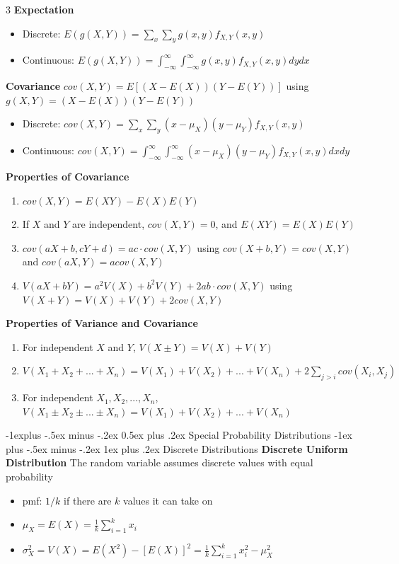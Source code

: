 \documentclass[10pt, landscape]{article}
\makeatletter
\renewcommand{\section}{\@startsection{section}{1}{0mm}%
                                {-1ex plus -.5ex minus -.2ex}%
                                {0.5ex plus .2ex}%
                                {\normalfont\large\bfseries}}
\renewcommand{\section}{\@startsection{section}{2}{0mm}%
                                {-1explus -.5ex minus -.2ex}%
                                {0.5ex plus .2ex}%
                                {\normalfont\normalsize\bfseries}}
\renewcommand{\subsection}{\@startsection{subsection}{3}{0mm}%
                                {-1ex plus -.5ex minus -.2ex}%
                                {1ex plus .2ex}%
                                {\normalfont\small\bfseries}}%
\makeatother
\begin{document}
\begin{multicols*}{3}
\textbf{Expectation}
\begin{itemize}
    \item Discrete: $E(g(X, Y))=\sum_x\sum_y g(x, y)f_{X, Y}(x, y)$
    \item Continuous: $E(g(X, Y))=\int_{-\infty}^\infty\int_{-\infty}^\infty g(x, y) f_{X, Y}(x, y)dydx$
\end{itemize}

\textbf{Covariance} $cov(X, Y)=E[(X-E(X))(Y-E(Y))]$ using $g(X, Y)=(X-E(X))(Y-E(Y))$
\begin{itemize}
    \item Discrete: $cov(X, Y)=\sum_x\sum_y(x-\mu_X)(y-\mu_Y)f_{X, Y}(x, y)$
    \item Continuous: $cov(X, Y)=\int_{-\infty}^\infty\int_{-\infty}^\infty(x-\mu_X)(y-\mu_Y)f_{X, Y}(x, y)dxdy$
\end{itemize}

\textbf{Properties of Covariance}
\begin{enumerate}
    \item $cov(X, Y)=E(XY)-E(X)E(Y)$
    \item If $X$ and $Y$ are independent, $cov(X, Y)=0$, and $E(XY)=E(X)E(Y)$
    \item $cov(aX+b, cY+d)=ac \cdot cov(X, Y)$ using $cov(X+b, Y)=cov(X, Y)$ and $cov(aX, Y)=acov(X, Y)$
    \item $V(aX+bY)=a^2V(X)+b^2V(Y)+2ab\cdot cov(X, Y)$ using $V(X+Y)=V(X)+V(Y)+2cov(X, Y)$
\end{enumerate}

\textbf{Properties of Variance and Covariance}
\begin{enumerate}
    \item For independent $X$ and $Y$, $V(X \pm Y)=V(X)+V(Y)$
    \item $V(X_1+X_2+...+X_n)=V(X_1)+V(X_2)+...+V(X_n)+2 \sum_{j > i}cov(X_i, X_j)$
    \item For independent $X_1, X_2, ... , X_n$, $V(X_1\pm X_2 \pm ... \pm X_n)=V(X_1)+V(X_2)+...+V(X_n)$
\end{enumerate}

\section{Special Probability Distributions}
\subsection{Discrete Distributions}
\textbf{Discrete Uniform Distribution} The random variable assumes discrete values with equal probability
\begin{itemize}
    \item pmf: $1/k$ if there are $k$ values it can take on
    \item $\mu_X=E(X)=\frac{1}{k}\sum_{i=1}^kx_i$
    \item $\sigma_X^2=V(X)=E(X^2)-[E(X)]^2=\frac{1}{k}\sum_{i=1}^k x_i^2-\mu_X^2$
\end{itemize}


\end{multicols*}
\end{document}

